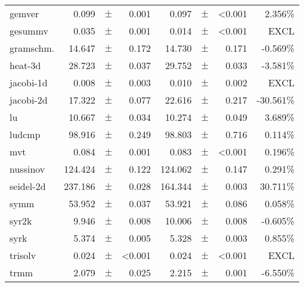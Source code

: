 \begin{table}
{\begin{tabular}{p{1.1cm}rp{0.01cm}rrp{0.01cm}rr}
\rowcolor{aluminium1}
gemver        & 0.099  & $\pm$ & 0.001 & 0.097  & $\pm$ &<0.001 & 2.356\%   \\
gesummv       & 0.035  & $\pm$ & 0.001 & 0.014  & $\pm$ &<0.001 & EXCL      \\
\rowcolor{aluminium1}
gramschm.     & 14.647 & $\pm$ & 0.172 & 14.730 & $\pm$ & 0.171 & -0.569\%  \\
heat-3d       & 28.723 & $\pm$ & 0.037 & 29.752 & $\pm$ & 0.033 & -3.581\%  \\
\rowcolor{aluminium1}
jacobi-1d     & 0.008  & $\pm$ & 0.003 & 0.010  & $\pm$ & 0.002 & EXCL      \\
jacobi-2d     & 17.322 & $\pm$ & 0.077 & 22.616 & $\pm$ & 0.217 & -30.561\% \\
\rowcolor{aluminium1}
lu            & 10.667 & $\pm$ & 0.034 & 10.274 & $\pm$ & 0.049 & 3.689\%   \\
ludcmp        & 98.916 & $\pm$ & 0.249 & 98.803 & $\pm$ & 0.716 & 0.114\%   \\
\rowcolor{aluminium1}
mvt           & 0.084  & $\pm$ & 0.001 & 0.083  & $\pm$ &<0.001 & 0.196\%   \\
nussinov      & 124.424& $\pm$ & 0.122 & 124.062& $\pm$ & 0.147 & 0.291\%   \\
\rowcolor{aluminium1}
seidel-2d     & 237.186& $\pm$ & 0.028 & 164.344& $\pm$ & 0.003 & 30.711\%  \\
symm          & 53.952 & $\pm$ & 0.037 & 53.921 & $\pm$ & 0.086 & 0.058\%   \\
\rowcolor{aluminium1}
syr2k         & 9.946  & $\pm$ & 0.008 & 10.006 & $\pm$ & 0.008 & -0.605\%  \\
syrk          & 5.374  & $\pm$ & 0.005 & 5.328  & $\pm$ & 0.003 & 0.855\%   \\
\rowcolor{aluminium1}
trisolv       & 0.024  & $\pm$ &<0.001 & 0.024  & $\pm$ &<0.001 & EXCL      \\
trmm          & 2.079  & $\pm$ & 0.025 & 2.215  & $\pm$ & 0.001 & -6.550\%  \\
\bottomrule
\end{tabular}
}
\end{table}